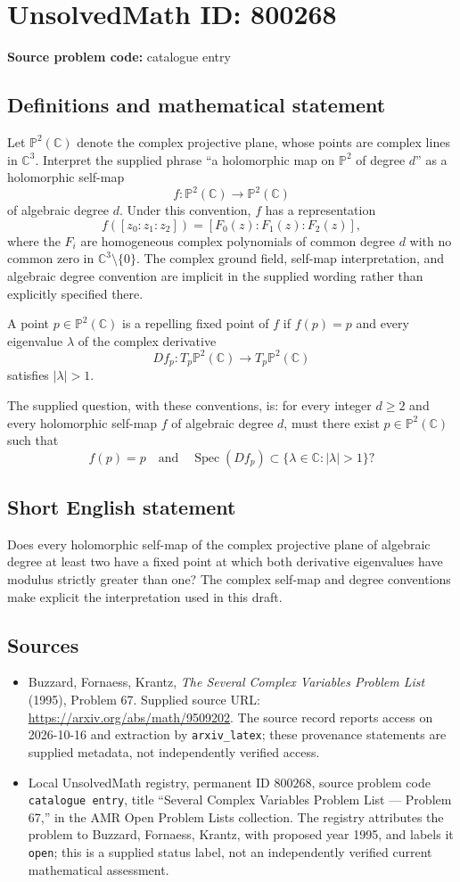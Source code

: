 \documentclass[11pt]{article}
\newcommand{\C}{\mathbb{C}}
\newcommand{\PP}{\mathbb{P}}
\begin{document}
\section*{UnsolvedMath ID: 800268}
\textbf{Source problem code:} catalogue entry
\subsection{Definitions and mathematical statement}
Let \(\PP^2(\C)\) denote the complex projective plane, whose points are complex lines in \(\C^3\). Interpret the supplied phrase ``a holomorphic map on \(\mathbb{P}^2\) of degree \(d\)'' as a holomorphic self-map
\[
f\colon \PP^2(\C)\longrightarrow\PP^2(\C)
\]
of algebraic degree \(d\). Under this convention, \(f\) has a representation
\[
f([z_0:z_1:z_2])=[F_0(z):F_1(z):F_2(z)],
\]
where the \(F_i\) are homogeneous complex polynomials of common degree \(d\) with no common zero in \(\C^3\setminus\{0\}\). The complex ground field, self-map interpretation, and algebraic degree convention are implicit in the supplied wording rather than explicitly specified there.

A point \(p\in\PP^2(\C)\) is a repelling fixed point of \(f\) if \(f(p)=p\) and every eigenvalue \(\lambda\) of the complex derivative
\[
D f_p\colon T_p\PP^2(\C)\longrightarrow T_p\PP^2(\C)
\]
satisfies \(|\lambda|>1\).

The supplied question, with these conventions, is: for every integer \(d\geq2\) and every holomorphic self-map \(f\) of algebraic degree \(d\), must there exist \(p\in\PP^2(\C)\) such that
\[
f(p)=p
\quad\text{and}\quad
\operatorname{Spec}(D f_p)\subset\{\lambda\in\C:|\lambda|>1\}?
\]
\subsection{Short English statement}
Does every holomorphic self-map of the complex projective plane of algebraic degree at least two have a fixed point at which both derivative eigenvalues have modulus strictly greater than one? The complex self-map and degree conventions make explicit the interpretation used in this draft.
\subsection{Sources}
\begin{itemize}
\item Buzzard, Fornaess, Krantz, \emph{The Several Complex Variables Problem List} (1995), Problem 67. Supplied source URL: \url{https://arxiv.org/abs/math/9509202}. The source record reports access on 2026-10-16 and extraction by \texttt{arxiv\_latex}; these provenance statements are supplied metadata, not independently verified access.
\item Local UnsolvedMath registry, permanent ID \(800268\), source problem code \texttt{catalogue entry}, title ``Several Complex Variables Problem List --- Problem 67,'' in the AMR Open Problem Lists collection. The registry attributes the problem to Buzzard, Fornaess, Krantz, with proposed year 1995, and labels it \texttt{open}; this is a supplied status label, not an independently verified current mathematical assessment.
\end{itemize}
\end{document}
